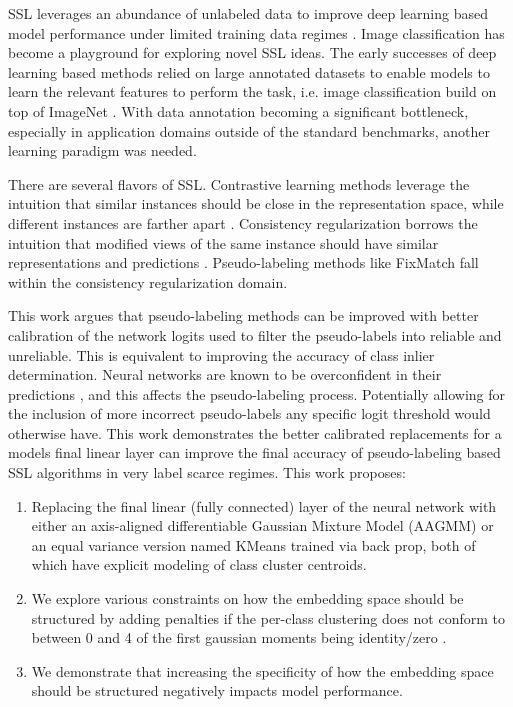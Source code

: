 \documentclass[10pt,twocolumn,letterpaper]{article}
\begin{document}
SSL leverages an abundance of unlabeled data to improve deep learning based model performance under limited training data regimes \cite{zhu2022introduction,li2019safe,hady2013semi}.
Image classification has become a playground for exploring novel SSL ideas.
The early successes of deep learning based methods relied on large annotated datasets to enable models to learn the relevant features to perform the task, i.e. image classification build on top of ImageNet \cite{deng2009imagenet}.
With data annotation becoming a significant bottleneck, especially in application domains outside of the standard benchmarks, another learning paradigm was needed.

There are several flavors of SSL.
Contrastive learning methods leverage the intuition that similar instances should be close in the representation space, while different instances are farther apart \cite{yang2022class,li2021comatch}.
Consistency regularization borrows the intuition that modified views of the same instance should have similar representations and predictions \cite{sohn2020fixmatch,lee2022contrastive,zhang2021flexmatch,kim2022conmatch}.
Pseudo-labeling methods like FixMatch \cite{sohn2020fixmatch} fall within the consistency regularization domain.

This work argues that pseudo-labeling methods can be improved with better calibration of the network logits used to filter the pseudo-labels into reliable and unreliable. 
This is equivalent to improving the accuracy of class inlier determination.
Neural networks are known to be overconfident in their predictions \cite{wei2022mitigating}, and this affects the pseudo-labeling process. 
Potentially allowing for the inclusion of more incorrect pseudo-labels any specific logit threshold would otherwise have.
This work demonstrates the better calibrated replacements for a models final linear layer can improve the final accuracy of pseudo-labeling based SSL algorithms in very label scarce regimes. 
This work proposes:

\begin{enumerate}
	\item Replacing the final linear (fully connected) layer of the neural network with either an axis-aligned differentiable Gaussian Mixture Model (AAGMM) or an equal variance version named KMeans trained via back prop, both of which have explicit modeling of class cluster centroids. 
	\item We explore various constraints on how the embedding space should be structured by adding penalties if the per-class clustering does not conform to between 0 and 4 of the first gaussian moments being identity/zero \cite{pearson1936method}.
	\item We demonstrate that increasing the specificity of how the embedding space should be structured negatively impacts model performance. 
\end{enumerate}
\end{document}
